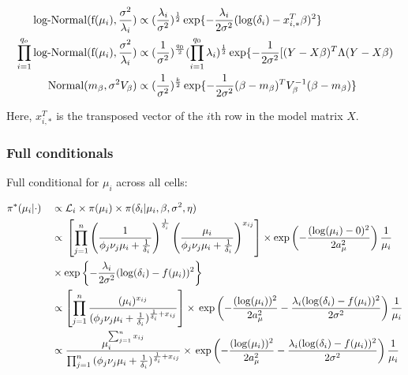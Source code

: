 \begin{align*}
\text{log-Normal}(\text{f}(\mu_i),\frac{\sigma^2}{\lambda_i})&\propto{}(\frac{\lambda_i}{\sigma^2})^{\frac{1}{2}}\exp\lbrace-\frac{\lambda_i}{2\sigma^2}(\log(\delta_i)-x_{i,\ast}^T\beta)^2\rbrace\\
\prod_{i=1}^{q_o}\text{log-Normal}(\text{f}(\mu_i),\frac{\sigma^2}{\lambda_i})&\propto{}(\frac{1}{\sigma^2})^{\frac{q_0}{2}}(\prod_{i=1}^{q_0}\lambda_i)^{\frac{1}{2}}\exp\lbrace-\frac{1}{2\sigma^2}[(Y-X\beta)^T\Lambda(Y-X\beta)\\
\textnormal{Normal}(m_\beta,\sigma^2V_\beta)&\propto{}(\frac{1}{\sigma^2})^{\frac{k}{2}}\exp\lbrace-\frac{1}{2\sigma^2}(\beta-m_\beta)^TV_\beta^{-1}(\beta-m_\beta)\rbrace\\
\end{align*}

Here, $x_{i,\ast}^T$ is the transposed vector of the $i$th row in the model matrix $X$.

\subsubsection{Full conditionals}

Full conditional for $\mu_i$ across all cells:
\begin{fleqn}
\begin{align*}
&\pi^*(\mu_i|\cdot)&&\propto{} \mathcal{L}_i\times\pi(\mu_i)\times\pi(\delta_i|\mu_i,\beta,\sigma^2,\eta)\\
& &&\propto{}\left[\prod_{j=1}^n\left(\frac{1}{\phi_j\nu_j\mu_i+\frac{1}{\delta_i}}\right)^\frac{1}{\delta_i}\left(\frac{\mu_i}{\phi_j\nu_j\mu_i+\frac{1}{\delta_i}}\right)^{x_{ij}}\right]\times\exp\left(-\frac{(\log(\mu_i)-0)^2}{2a_\mu^2}\right)\frac{1}{\mu_i}\\
& &&\times\exp\left\lbrace-\frac{\lambda_i}{2\sigma^2}(\log(\delta_i)-f(\mu_i))^2\right\rbrace\\
& &&\propto\left[\prod_{j=1}^n{}\frac{(\mu_i)^{x_{ij}}}{(\phi_j\nu_j\mu_i+\frac{1}{\delta_i})^{\frac{1}{\delta_i}+x_{ij}}}\right]\times{}\exp\left(-\frac{(\log(\mu_i))^2}{2a_\mu^2}-\frac{\lambda_i(\log(\delta_i)-f(\mu_i))^2}{2\sigma^2}\right)\frac{1}{\mu_i}\\
& &&\propto{}\frac{\mu_i^{\sum_{j=1}^n{}x_{ij}}}{\prod_{j=1}^n{}(\phi_j\nu_j\mu_i+\frac{1}{\delta_i})^{\frac{1}{\delta_i}+x_{ij}}}\times{}\exp\left(-\frac{(\log(\mu_i))^2}{2a_\mu^2}-\frac{\lambda_i(\log(\delta_i)-f(\mu_i))^2}{2\sigma^2}\right)\frac{1}{\mu_i}
\end{align*}
\end{fleqn}

